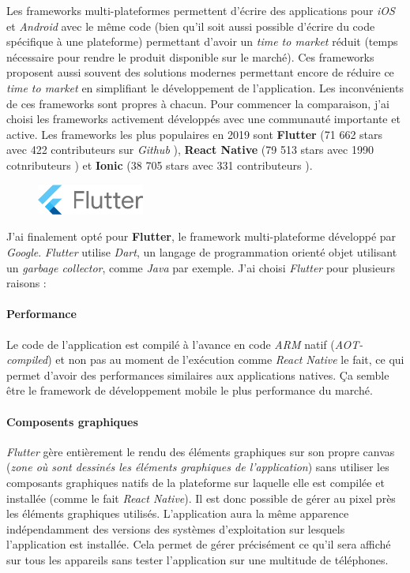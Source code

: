 Les frameworks multi-plateformes permettent d'écrire des applications pour \textit{iOS} et \textit{Android} avec le même code (bien qu'il soit aussi possible d'écrire du code spécifique à une plateforme) permettant d'avoir un \textit{time to market} réduit (temps nécessaire pour rendre le produit disponible sur le marché). Ces frameworks proposent aussi souvent des solutions modernes permettant encore de réduire ce \textit{time to market} en simplifiant le développement de l'application. Les inconvénients de ces frameworks sont propres à chacun. Pour commencer la comparaison, j'ai choisi les frameworks activement développés avec une communauté importante et active. Les frameworks les plus populaires en 2019 sont \textbf{Flutter} (71 662 stars avec 422 contributeurs sur \textit{Github} \cite{flutter}), \textbf{React Native} (79 513 stars avec 1990 cotnributeurs \cite{react}) et \textbf{Ionic} (38 705 stars avec 331 contributeurs \cite{ionic}).

\begin{figure}
  \includegraphics[width=100pt]{content/imgs/flutter.png}
\end{figure}

J'ai finalement opté pour \textbf{Flutter}, le framework multi-plateforme développé par \textit{Google}. \textit{Flutter} utilise \textit{Dart}, un langage de programmation orienté objet utilisant un \textit{garbage collector}, comme \textit{Java} par exemple. J'ai choisi \textit{Flutter} pour plusieurs raisons :

\paragraph{Performance}
Le code de l'application est compilé à l'avance en code \textit{ARM} natif (\textit{AOT-compiled}) et non pas au moment de l'exécution comme \textit{React Native} le fait, ce qui permet d'avoir des performances similaires aux applications natives. Ça semble être le framework de développement mobile le plus performance du marché.

\paragraph{Composents graphiques}
\textit{Flutter} gère entièrement le rendu des éléments graphiques sur son propre canvas (\textit{zone où sont dessinés les éléments graphiques de l'application}) sans utiliser les composants graphiques natifs de la plateforme sur laquelle elle est compilée et installée (comme le fait \textit{React Native}). Il est donc possible de gérer au pixel près les éléments graphiques utilisés. L'application aura la même apparence indépendamment des versions des systèmes d'exploitation sur lesquels l'application est installée. Cela permet de gérer précisément ce qu'il sera affiché sur tous les appareils sans tester l'application sur une multitude de téléphones.


